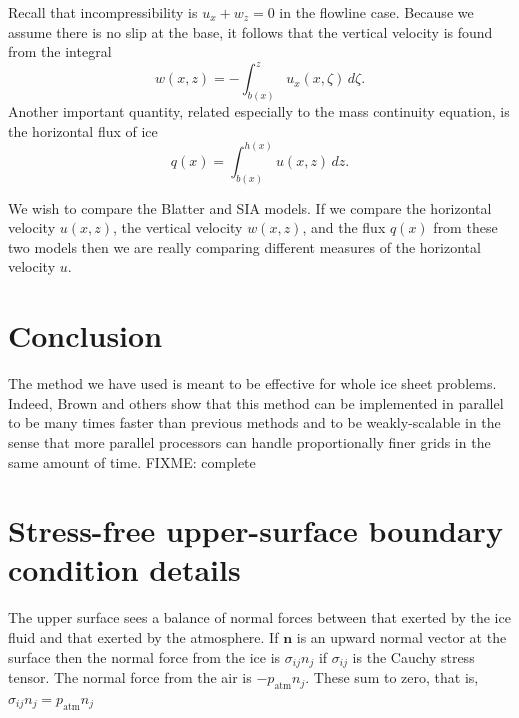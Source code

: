 \documentclass[11pt,final,reqno]{amsart}
\theoremstyle{remark}
\theoremstyle{definition}
\begin{document}
Recall that incompressibility is $u_x + w_z = 0$ in the flowline case.  Because we assume there is no slip at the base, it follows that the vertical velocity is found from the integral
\begin{equation}
w(x,z) = - \int_{b(x)}^z u_x(x,\zeta)\,d\zeta. \label{incomp}
\end{equation}
Another important quantity, related especially to the mass continuity equation, is the horizontal flux of ice
\begin{equation}
q(x) = \int_{b(x)}^{h(x)} u(x,z)\,dz.\label{flux}
\end{equation}

We wish to compare the Blatter and SIA models.  If we compare the horizontal velocity $u(x,z)$, the vertical velocity $w(x,z)$, and the flux $q(x)$ from these two models then we are really comparing different measures of the horizontal velocity $u$.


\newpage
\section{Conclusion}  The method we have used is meant to be effective for whole ice sheet problems.  Indeed, Brown and others \cite{BrownSmithAhmadia2013} show that this method can be implemented in parallel to be many times faster than previous methods and to be weakly-scalable in the sense that more parallel processors can handle proportionally finer grids in the same amount of time.  FIXME: complete

\newpage





\appendix

\newpage
\section{Stress-free upper-surface boundary condition details}  The upper surface sees a balance of normal forces between that exerted by the ice fluid and that exerted by the atmosphere.  If $\mathbf{n}$ is an upward normal vector at the surface then the normal force from the ice is $\sigma_{ij} n_j$ if $\sigma_{ij}$ is the Cauchy stress tensor.  The normal force from the air is $-p_{\text{atm}} n_j$.  These sum to zero, that is, $\sigma_{ij} n_j = p_{\text{atm}} n_j$
\end{document}
